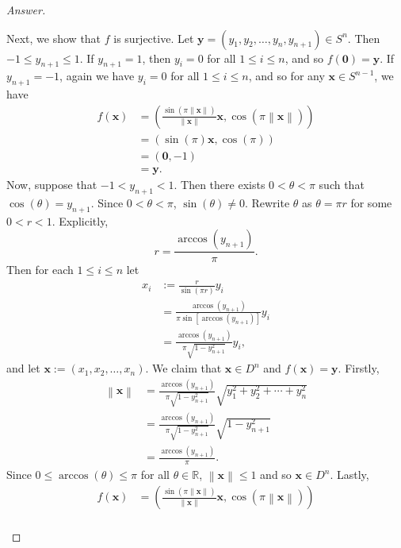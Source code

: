 \documentclass[12pt]{article}
\newcommand{\real}{\mathbb{R}}
\newcommand\paren[1]{\left( #1 \right)}
\newcommand{\sqbrack}[1]{\left [ #1 \right ]}
\newcommand{\norm}[1]{\left \| #1 \right \|}
\theoremstyle{definition}
\begin{document}
\begin{proof}[Answer]
\begin{enumerate}[(a)]
        Next, we show that $f$ is surjective. Let $\mathbf{y} = \paren{ y_1 , y_2 , \dotsc , y_n , y_{n+1} } \in S^n$. Then $-1 \leq y_{n+1} \leq 1$. If $y_{n+1} = 1$, then $y_i = 0$ for all $1 \leq i \leq n$, and so $f \paren{ \mathbf{0} } = \mathbf{y}$. If $y_{n+1} = -1$, again we have $y_i = 0$ for all $1 \leq i \leq n$, and so for any $\mathbf{x} \in S^{n-1}$, we have 
        \begin{align*}
            f \paren{ \mathbf{x} } & = \paren{ \frac{ \sin \paren{ \pi \norm { \mathbf{x} } } }{\norm{\mathbf{x}}} \mathbf{x} , \cos \paren{ \pi \norm{ \mathbf{x} } } } \\
            & = \paren{ \sin(\pi) \mathbf{x} , \cos(\pi) } \\
            & = \paren{ \mathbf{0} , -1 } \\
            & = \mathbf{y}.
        \end{align*}
        Now, suppose that $-1 < y_{n+1} < 1$. Then there exists $0 < \theta < \pi$ such that $\cos(\theta) = y_{n+1}$. Since $0 < \theta < \pi$, $\sin(\theta) \neq 0$. Rewrite $\theta$ as $\theta = \pi r$ for some $0 < r < 1$. Explicitly,
        \[
            r = \frac{\arccos\paren{y_{n+1}}}{\pi}.
        \]
        Then for each $1 \leq i \leq n$ let
        \begin{align*}
            x_i & := \frac{r}{\sin(\pi r)} y_i \\
            & = \frac{\arccos\paren{y_{n+1}}}{\pi \sin \sqbrack{ \arccos \paren{ y_{n+1} } }} y_i \\
            & = \frac{\arccos\paren{y_{n+1}}}{\pi \sqrt{1-y_{n+1}^2}} y_i,
        \end{align*}
        and let $\mathbf{x} := \paren{ x_1 , x_2 , \dotsc , x_n }$. We claim that $\mathbf{x} \in D^n$ and $f \paren{ \mathbf{x} } = \mathbf{y}$. Firstly,
        \begin{align*}
            \norm{ \mathbf{x} } & = \frac{\arccos\paren{y_{n+1}}}{\pi \sqrt{1-y_{n+1}^2}} \sqrt{ y_1^2 + y_2^2 + \dotsb + y_n^2} \\
            & = \frac{\arccos\paren{y_{n+1}}}{\pi \sqrt{1-y_{n+1}^2}} \sqrt{1-y_{n+1}^2} \\
            & = \frac{\arccos\paren{y_{n+1}}}{\pi}.
        \end{align*}
        Since $0 \leq \arccos(\theta) \leq \pi$ for all $\theta \in \real$, $\norm{ \mathbf{x} } \leq 1$ and so $\mathbf{x} \in D^n$. Lastly,
        \begin{align*}
            f \paren{ \mathbf{x} } & = \paren{ \frac{ \sin \paren{ \pi \norm { \mathbf{x} } } }{\norm{\mathbf{x}}} \mathbf{x} , \cos \paren{ \pi \norm{ \mathbf{x} } } } \\

\end{align*}
\end{enumerate}
\end{proof}
\end{document}
